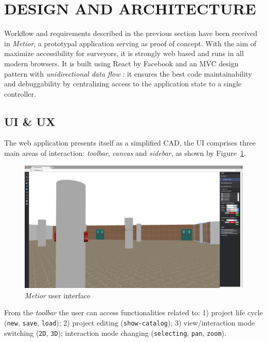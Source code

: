 \section{\uppercase{Design and Architecture}}
\label{sec:architecture}

\noindent Workflow and requirements described in the previous section have been received in \emph{Metior}, a prototypal application serving as proof of concept. With the aim of maximize accessibility for surveyors, it is strongly web based and runs in all modern browsers. It is built using React by Facebook and an MVC design pattern with \emph{unidirectional data flow} \cite{redux}:  it ensures the best code maintainability and debuggability by centralizing access to the application state to a single controller.

\subsection{UI \& UX}

The web application presents itself as a simplified CAD,  the UI comprises three main areas of interaction: \emph{toolbar}, \emph{canvas} and \emph{sidebar}, as shown by Figure~\ref{fig:ui}.

\begin{figure}[htbp] %
   \centering

   \includegraphics[width=1\linewidth]{images/ui}

   \caption{\emph{Metior} user interface}
   \label{fig:ui}
\end{figure}

\noindent From the \emph{toolbar} the user can access functionalities related to: 1) project life cycle ({\tt new}, {\tt save}, {\tt load}); 2) project editing  ({\tt  show-catalog}); 3) view/interaction mode switching ({\tt 2D}, {\tt  3D}); interaction mode changing ({\tt  selecting}, {\tt pan}, {\tt zoom}).

